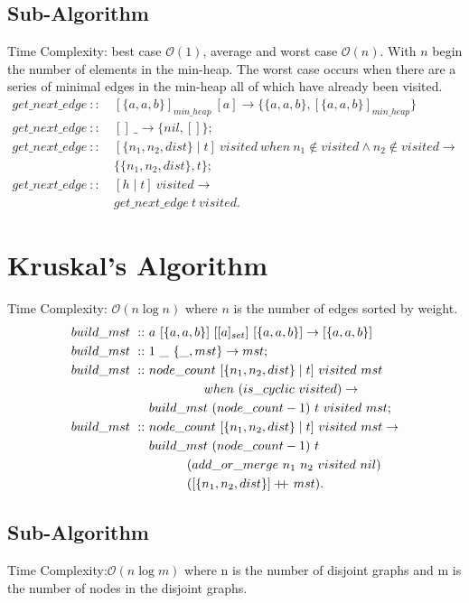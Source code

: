 \documentclass[a4paper,10pt]{book}
\newcommand\when{\  when\ }
\newcommand\doubleplus{+\kern-1.3ex+\kern0.8ex}
\begin{document}
\subsection{Sub-Algorithm}
Time Complexity: best case $\mathcal{O}(1)$, average and worst case $\mathcal{O}(n)$. With $n$ begin the number of elements in the min-heap. The worst case occurs when there are a series of minimal edges in the min-heap all of which have already been visited.
\begin{align*}
get\_next\_edge\ ::\ &[\{a,a,b\}]_{min\_heap}\ [a]\rightarrow\{\{a,a,b\},[\{a,a,b\}]_{min\_heap}\}\\
get\_next\_edge\ ::\ &[]\ \_\rightarrow \{nil,[]\};\\
get\_next\_edge\ ::\ &[\{n_1,n_2,dist\}\mid t]\ visited\when n_1\not\in visited \land n_2\not\in visited\rightarrow\\
	&\{\{n_1,n_2,dist\}, t\};\\
get\_next\_edge\ ::\ &[h\mid t]\ visited\rightarrow\\
	&get\_next\_edge\ t\ visited.
\end{align*}

\section {Kruskal's Algorithm}
Time Complexity: $\mathcal{O}(n\log n)$ where $n$ is the number of edges sorted by weight.
\begin{align*}
build\_mst\ ::\ &a\ [\{a,a,b\}]\ [[a]_{set}]\ [\{a,a,b\}]\rightarrow [\{a,a,b\}]\\
build\_mst\ ::\ &1\ \_\ \{\_,mst\}\rightarrow mst;\\
build\_mst\ ::\ &node\_count\ [\{n_1,n_2,dist\}\mid t]\ visited\ mst\\
	&\qquad\qquad\when (is\_cyclic\ visited)\rightarrow\\
	&build\_mst\ (node\_count -1)\ t\ visited\ mst;\\
build\_mst\ ::\ &node\_count\  [\{n_1,n_2,dist\}\mid t]\ visited\ mst\rightarrow\\
	&build\_mst\ (node\_count -1)\ t\\
	&\qquad\quad(add\_or\_merge\ n_1\ n_2\ visited\ nil)\\
	&\qquad\quad([\{n_1,n_2,dist\}]\doubleplus mst).
\end{align*}
\subsection{Sub-Algorithm}
Time Complexity:$\mathcal{O}(n\log m)$ where n is the number of disjoint graphs and m is the number of nodes in the disjoint graphs.
\end{document}
